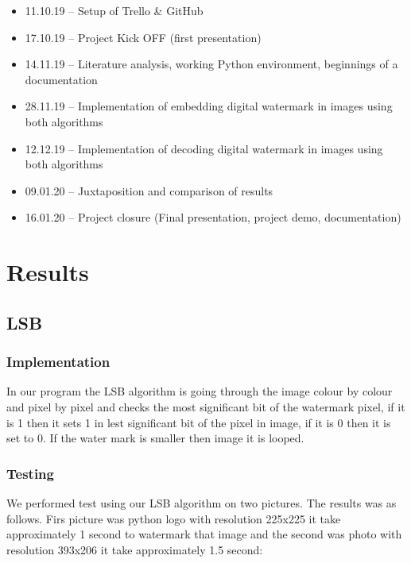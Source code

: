 \documentclass[a4paper, 12pt]{article}
\begin{document}
	\begin{itemize}
	

	\item 11.10.19 – Setup of Trello \& GitHub
	\item 17.10.19 – Project Kick OFF (first presentation)
	\item 14.11.19 – Literature analysis, working Python environment, beginnings of a documentation
	\item 28.11.19 – Implementation of embedding digital watermark in images using both algorithms
	\item 12.12.19 – Implementation of decoding digital watermark in images using both algorithms
	\item 09.01.20 – Juxtaposition and comparison of results
	\item 16.01.20 – Project closure (Final presentation, project demo, documentation)
	\end{itemize}
	
\section{Results}

	\subsection{LSB}

	    \subsubsection{Implementation}
    	In our program the LSB algorithm is going through the image colour by colour and pixel by pixel and checks the most significant bit of the watermark pixel, if it is 1 then it sets 1 in lest significant bit of the pixel in image, if it is 0 then it is set to 0. If the water mark is smaller then image it is looped.

    	\subsubsection{Testing}
    	We performed test using our LSB algorithm on two pictures. The results was as follows.
    	Firs picture was python logo with resolution 225x225 it take approximately 1 second to watermark that image and the second was photo with resolution 393x206 it take approximately 1.5 second:
\end{document}
